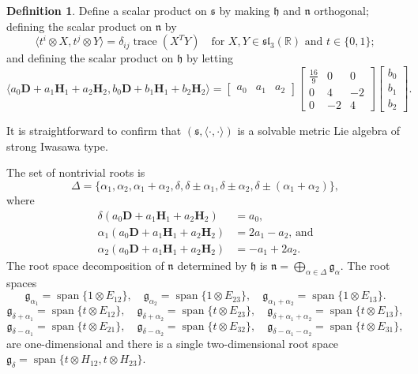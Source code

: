 \documentclass[12pt]{amsart}
\newcommand{\la}{\langle}
\newcommand{\ra}{\rangle}
\newcommand{\smallfrac}[2]{\textstyle{\frac{#1}{#2}}  }
\newcommand{\bfD}{\ensuremath{\mathbf D} }
\newcommand{\bfH}{\ensuremath{\mathbf H} }
\newcommand\boldR{\ensuremath{\mathbb R}}
\newcommand{\myspan}{\operatorname{span}}
\newcommand{\frakg}{\ensuremath{\mathfrak{g}} }
\newcommand{\frakh}{\ensuremath{\mathfrak{h}} }
\newcommand{\frakn}{\ensuremath{\mathfrak{n}} }
\newcommand{\fraks}{\ensuremath{\mathfrak{s}} }
\newcommand\fraksl{{\mathfrak{sl}}}
\newcommand\ip{{\langle\cdot {,} \cdot\rangle}}
\newcommand\tr{\operatorname{trace}}
\theoremstyle{plain}
\theoremstyle{definition}
\newtheorem{defn}[theorem]{Definition}
\theoremstyle{remark}
\numberwithin{equation}{section}
\numberwithin{theorem}{section}
\begin{document}
\begin{defn}
Define a scalar product on $\fraks$ by 
making $\frakh$ and $\frakn$ orthogonal;  defining the scalar  product on $\frakn$ by 
\begin{equation}\label{eqn: ad s} \la t^i \otimes X, t^j \otimes Y \ra = \delta_{ij}\tr( X^TY)\quad \text{for $X, Y \in \fraksl_3(\boldR)$ and $t \in \{0,1\}$};\end{equation}
and defining the scalar  product on $\frakh$ by
   letting  
\begin{equation}\label{eqn: mtx def}\la a_0 \bfD + a_1 \bfH_1 + a_2 \bfH_2, b_0 \bfD + b_1 \bfH_1 + b_2 \bfH_2 \ra = \begin{bmatrix} a_0 & a_1 & a_2\end{bmatrix}
\begin{bmatrix} \smallfrac{16}{9} & 0 & 0 \\ 0 & 4 & -2 \\ 0 & -2 & 4 \end{bmatrix}
\begin{bmatrix} b_0 \\ b_1 \\ b_2\end{bmatrix}.
\end{equation}
\end{defn}
It is straightforward to confirm that $(\fraks,\ip)$ is a solvable metric Lie algebra  of strong Iwasawa type.


The set of nontrivial roots is 
\[ \Delta = \{ \alpha_1, \alpha_2, \alpha_1+\alpha_2, \delta, \delta \pm \alpha_1, \delta \pm \alpha_2, \delta \pm (\alpha_1+\alpha_2)\},\] where 
\begin{align*} 
 \delta(a_0 \bfD + a_1 \bfH_1 + a_2 \bfH_2) &= a_0,  \\
 \alpha_1(a_0 \bfD + a_1 \bfH_1 + a_2 \bfH_2) &=  2a_1 - a_2, \, \text{and}\\   
 \alpha_2(a_0 \bfD + a_1 \bfH_1 + a_2 \bfH_2) &=  - a_1 + 2a_2. 
\end{align*}
The root space decomposition of $\frakn$ determined by $\frakh$ is 
$ \frakn =  \bigoplus_{\alpha \in \Delta} \frakg_\alpha.$
The  root spaces 
\[\frakg_{\alpha_1} = \myspan \{ 1 \otimes E_{12}\},\quad \frakg_{\alpha_2} = \myspan \{ 1 \otimes E_{23}\}, \quad \frakg_{\alpha_1+\alpha_2} = \myspan \{1 \otimes E_{13}\}. \] 
\[  \frakg_{\delta + \alpha_1} = \myspan \{t \otimes E_{12}\}, \quad \frakg_{\delta + \alpha_2} = \myspan \{t \otimes E_{23}\}, \quad \frakg_{\delta +\alpha_1 + \alpha_2} = \myspan \{t \otimes E_{13}\},\]
\[  \frakg_{\delta -\alpha_1}= \myspan \{t \otimes E_{21}\}, \quad \frakg_{\delta-\alpha_2} = \myspan \{t \otimes E_{32}\}, \quad \frakg_{\delta-\alpha_1-\alpha_2} = \myspan \{t \otimes E_{31}\},\]
are one-dimensional and there is a single two-dimensional  root space 
  $\frakg_{\delta}= \myspan \{t \otimes
  H_{12}, t \otimes H_{23} \}.$
\end{document}
